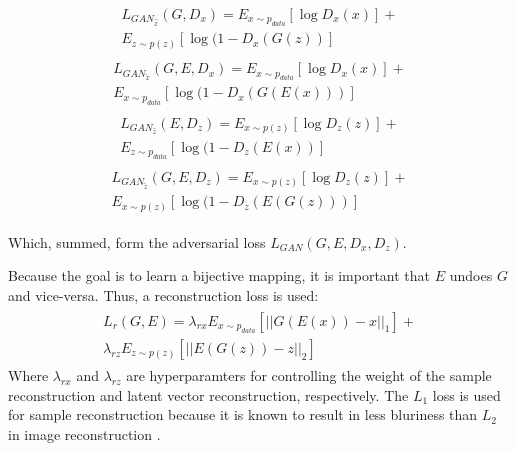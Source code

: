 \documentclass[letterpaper]{article} %
\begin{document}
\begin{gather}\label{eq:2}
    \begin{aligned}
        {L}_{GAN_{\hat{x}}}(G, D_x) =E_{x \sim p_{data}}[\log D_{x}(x)] + \\E_{z \sim p(z)}[\log (1 - D_{x}(G(z))]
    \end{aligned}
\end{gather}
\begin{gather}\label{eq:3}
    \begin{aligned}
        {L}_{GAN_{\tilde{x}}}(G, E, D_x) = E_{x \sim p_{data}}[\log D_{x}(x)] + \\E_{x \sim p_{data}}[\log (1 - D_{x}(G(E(x)))]
    \end{aligned}
\end{gather}
\begin{gather}\label{eq:4}
    \begin{aligned}
        {L}_{GAN_{\hat{z}}}(E, D_z) = E_{x \sim p(z)}[\log D_{z}(z)] + \\E_{z \sim p_{data}}[\log (1 - D_{z}(E(x))]
    \end{aligned}
\end{gather}
\begin{gather}\label{eq:5}
    \begin{aligned}
        {L}_{GAN_{\tilde{z}}}(G, E, D_z) = E_{x \sim p(z)}[\log D_{z}(z)] +\\ E_{x \sim p(z)}[\log (1 - D_{z}(E(G(z)))]
    \end{aligned}
\end{gather}

Which, summed, form the adversarial loss ${L}_{GAN}(G, E, D_x, D_z)$\cite{AEGAN}. 

Because the goal is to learn a bijective mapping, it is important that $E$ undoes $G$ and vice-versa. Thus, a reconstruction loss is used:
\begin{gather}\label{eq:6}
    \begin{aligned}
      {L}_{r}(G, E) = \lambda_{rx}E_{x \sim p_{data}}[\left| \left| G(E(x)) - x \right| \right|_1] +\\ \lambda_{rz}E_{z \sim p(z)}[\left| \left| E(G(z)) - z \right| \right|_2] 
    \end{aligned}
\end{gather}
Where $\lambda_{rx}$ and $\lambda_{rz}$ are hyperparamters for controlling the weight of the sample reconstruction and latent vector reconstruction, respectively. The $L_1$ loss is used for sample reconstruction because it is known to result in less bluriness than $L_2$ in image reconstruction \cite{AEGAN}.
\end{document}
